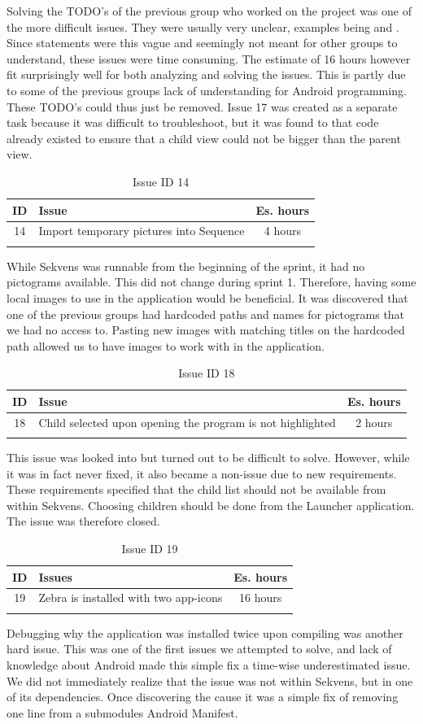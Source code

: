 Solving the TODO's of the previous group who worked on the project was one of the more difficult issues. They were usually very unclear, examples being  and . Since statements were this vague and seemingly not meant for other groups to understand, these issues were time consuming. The estimate of 16 hours however fit surprisingly well for both analyzing and solving the issues. This is partly due to some of the previous groups lack of understanding for Android programming. These TODO's could thus just be removed. Issue 17 was created as a separate task because it was difficult to troubleshoot, but it was found to that code already existed to ensure that a child view could not be bigger than the parent view.

\begin{longtable} { | c | p{12cm} | c | } 
\hline
	ID 	&	Issue	&		 Es. hours \\\hline
	14	& 	Import temporary pictures into Sequence	&	4 hours	\\\hline
\caption{Issue ID 14}
\label{tab:spr1_issue14}
\end{longtable}
While Sekvens was runnable from the beginning of the sprint, it had no pictograms available. This did not change during sprint 1. Therefore, having some local images to use in the application would be beneficial. It was discovered that one of the previous groups had hardcoded paths and names for pictograms that we had no access to. Pasting new images with matching titles on the hardcoded path allowed us to have images to work with in the application.

\begin{longtable} { | c | p{12cm} | c | } 
\hline
	ID 	&	Issue	&		 Es. hours \\\hline
	18	& 	Child selected upon opening the program is not highlighted	&	2 hours	\\\hline
\caption{Issue ID 18}
\label{tab:spr1_issue18}
\end{longtable}
This issue was looked into but turned out to be difficult to solve. However, while it was in fact never fixed, it also became a non-issue due to new requirements. These requirements specified that the child list should not be available from within Sekvens. Choosing children should be done from the Launcher application. The issue was therefore closed.

\begin{longtable} { | c | p{12cm} | c | } 
\hline
	ID 	&	Issues	&		 Es. hours \\\hline
	19	& 	Zebra is installed with two app-icons	&	16 hours	\\\hline
\caption{Issue ID 19}
\label{tab:spr1_issue19}
\end{longtable}
Debugging why the application was installed twice upon compiling was another hard issue. This was one of the first issues we attempted to solve, and lack of knowledge about Android made this simple fix a time-wise underestimated issue. We did not immediately realize that the issue was not within Sekvens, but in one of its dependencies. Once discovering the cause it was a simple fix of removing one line from a submodules Android Manifest.

